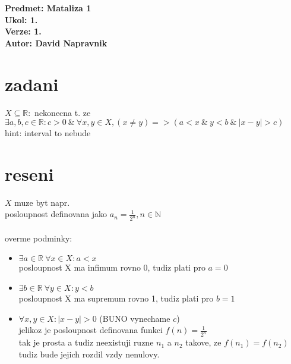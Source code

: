 \documentclass[a4paper]{article}
\begin{document}
\noindent
\textbf{Predmet: Mataliza 1}\\
\textbf{Ukol: 1.}\\
\textbf{Verze: 1.}\\
\textbf{Autor: David Napravnik}

\section*{zadani}
$X \subseteq \mathbb{R}:$ nekonecna t. ze\\
$\exists a,b,c \in \mathbb{R}: c>0 ~\&~ \forall x,y \in X,
(x\neq y) => (a < x ~\&~ y<b ~\&~ |x-y|>c)$\\
hint: interval to nebude

\section*{reseni}
$X$ muze byt napr.\\
posloupnost definovana jako $a_n = \frac{1}{2^n}, n\in\mathbb{N}$\\
\\
overme podminky:\\
\begin{itemize}
	\item $\exists a \in \mathbb{R}~\forall x \in X: a<x$\\
	posloupnost X ma infimum rovno 0, tudiz plati pro $a=0$
	\item $\exists b \in \mathbb{R}~\forall y \in X: y<b$\\
	posloupnost X ma supremum rovno 1, tudiz plati pro $b=1$
	\item $\forall x,y \in X:|x-y|>0$ (BUNO vynechame $c$)\\
	jelikoz je posloupnost definovana funkci
	$f(n) = \frac{1}{2^n}$\\
	tak je prosta a tudiz neexistuji ruzne $n_1$ a
	$n_2$ takove, ze $f(n_1) = f(n_2)$\\
	tudiz bude jejich rozdil vzdy nenulovy.
\end{itemize}
\end{document}

